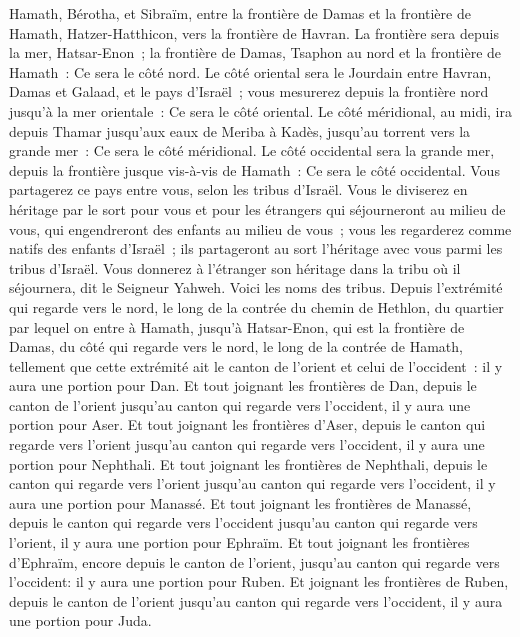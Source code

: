 \begin{multicols}{2}
Hamath, Bérotha, et Sibraïm, entre la frontière de Damas et la frontière de Hamath, Hatzer-Hatthicon, vers la frontière de Havran.
La frontière sera depuis la mer, Hatsar-Enon~; la frontière de Damas, Tsaphon au nord et la frontière de Hamath~: Ce sera le côté nord.
Le côté oriental sera le Jourdain entre Havran, Damas et Galaad, et le pays d'Israël~; vous mesurerez depuis la frontière nord jusqu'à la mer orientale~: Ce sera le côté oriental.
Le côté méridional, au midi, ira depuis Thamar jusqu'aux eaux de Meriba à Kadès, jusqu'au torrent vers la grande mer~: Ce sera le côté méridional.
Le côté occidental sera la grande mer, depuis la frontière jusque vis-à-vis de Hamath~: Ce sera le côté occidental.
Vous partagerez ce pays entre vous, selon les tribus d'Israël.
Vous le diviserez en héritage par le sort pour vous et pour les étrangers qui séjourneront au milieu de vous, qui engendreront des enfants au milieu de vous~; vous les regarderez comme natifs des enfants d'Israël~; ils partageront au sort l'héritage avec vous parmi les tribus d'Israël.
Vous donnerez à l'étranger son héritage dans la tribu où il séjournera, dit le Seigneur Yahweh.
\VerseOne{}Voici les noms des tribus. Depuis l'extrémité qui regarde vers le nord, le long de la contrée du chemin de Hethlon, du quartier par lequel on entre à Hamath, jusqu'à Hatsar-Enon, qui est la frontière de Damas, du côté qui regarde vers le nord, le long de la contrée de Hamath, tellement que cette extrémité ait le canton de l'orient et celui de l'occident~: il y aura une portion pour Dan.
Et tout joignant les frontières de Dan, depuis le canton de l'orient jusqu'au canton qui regarde vers l'occident, il y aura une portion pour Aser.
Et tout joignant les frontières d'Aser, depuis le canton qui regarde vers l'orient jusqu'au canton qui regarde vers l'occident, il y aura une portion pour Nephthali.
Et tout joignant les frontières de Nephthali, depuis le canton qui regarde vers l'orient jusqu'au canton qui regarde vers l'occident, il y aura une portion pour Manassé. 
Et tout joignant les frontières de Manassé, depuis le canton qui regarde vers l'occident jusqu'au canton qui regarde vers l'orient, il y aura une portion pour Ephraïm. 
Et tout joignant les frontières d'Ephraïm, encore depuis le canton de l'orient, jusqu'au canton qui regarde vers l'occident: il y aura une portion pour Ruben. 
Et joignant les frontières de Ruben, depuis le canton de l'orient jusqu'au canton qui regarde vers l'occident, il y aura une portion pour Juda.

\end{multicols}
